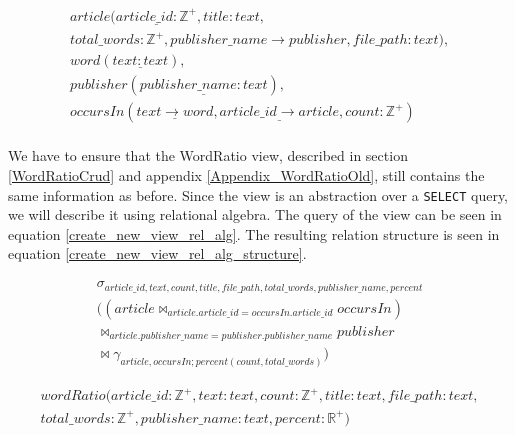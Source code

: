 \begin{equation}\label{eq:newDatabaseRelationalModel}
    \begin{split}
        article(\underline{article\_id: \mathbb{Z^+}}, title:text,\\ total\_words:\mathbb{Z^+}, publisher\_name \rightarrow publisher, file\_path:text), \\
        word(\underline{text:text}),\\
        publisher(\underline{publisher\_name:text}),\\
        occursIn(\underline{text \rightarrow word}, \underline{article\_id \rightarrow article}, count:\mathbb{Z^+})\\
    \end{split}
\end{equation}


We have to ensure that the WordRatio view, described in section \ref{WordRatioCrud} and appendix \ref{Appendix_WordRatioOld}, still contains the same information as before.
Since the view is an abstraction over a \texttt{SELECT} query, we will describe it using relational algebra.
The query of the view can be seen in equation \ref{create_new_view_rel_alg}.
The resulting relation structure is seen in equation \ref{create_new_view_rel_alg_structure}.


\begin{equation}\label{create_new_view_rel_alg}
    \begin{split}
        \sigma_{article\_id, text, count,title, file\_path, total\_words, publisher\_name, percent} \\
        ((article \Join_{article.article\_id = occursIn.article\_id} occursIn) \\
        \Join_{article.publisher\_name = publisher.publisher\_name} publisher\\
        \Join \gamma_{article, occursIn;percent(count, total\_words)})
    \end{split}
\end{equation}

\begin{equation}\label{create_new_view_rel_alg_structure}
    \begin{split}
        wordRatio(article\_id:\mathbb{Z^+}, text:text, count:\mathbb{Z^+},title:text, file\_path:text,\\ total\_words:\mathbb{Z^+}, publisher\_name:text, percent:\mathbb{R^+})
    \end{split}
\end{equation}


